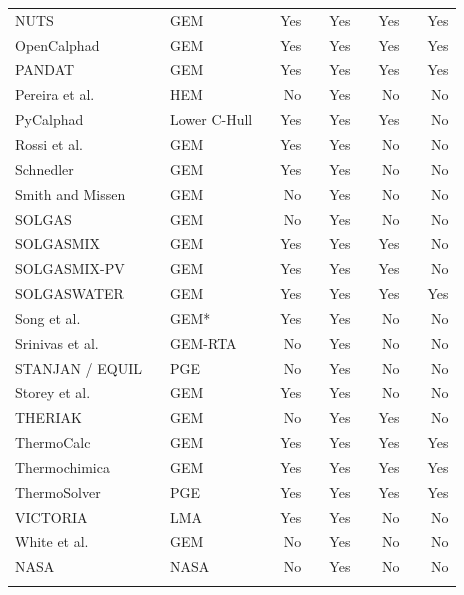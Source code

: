 {\begin{longtable}{@{}lclcrcrcrcr@{}}
		NUTS \cite{Loukusa:2014aa} && {GEM} && Yes && Yes && Yes && Yes\\
		OpenCalphad \cite{Sundman:2015aa} && {GEM} && Yes && Yes && Yes && Yes\\
		PANDAT \cite{Cao09} && {GEM} && Yes && Yes && Yes && Yes\\
		Pereira et al. \cite{PEREIRA20101} && {HEM} && No && Yes && No && No\\
		PyCalphad \cite{Otis:2017aa} && {Lower C-Hull} && Yes && Yes && Yes && No\\
		Rossi et al. \cite{ROSSI20111226} && GEM && Yes && Yes && No && No\\
		Schnedler \cite{SCHNEDLER1984265} && GEM && Yes && Yes && No && No\\
		Smith and Missen \cite{Smith:1988aa} && GEM && No && Yes && No && No\\
		SOLGAS \cite{Eriksson71} && GEM && No && Yes && No && No\\
		SOLGASMIX \cite{Eriksson:1975aa} && GEM && Yes && Yes && Yes && No\\
		SOLGASMIX-PV \cite{Besmann:1977aa} && GEM && Yes && Yes && Yes && No\\
		SOLGASWATER \cite{ERIKSSON1979375} && GEM && Yes && Yes && Yes && Yes\\
		Song et al. \cite{SONG19912513} && GEM* && Yes && Yes && No && No\\
		Srinivas et al. \cite{Srinivas06} && GEM-RTA && No && Yes && No && No\\
		STANJAN / EQUIL \cite{Reynolds86} && PGE && No && Yes && No && No\\
		Storey et al. \cite{Storey:1964aa} && GEM && Yes && Yes && No && No\\
		THERIAK \cite{DECAPITANI19872639} && GEM && No && Yes && Yes && No\\
		ThermoCalc \cite{ANDERSSON2002273} && GEM && Yes && Yes && Yes && Yes\\
		Thermochimica \cite{Piro13} && GEM && Yes && Yes && Yes && Yes\\
		ThermoSolver \cite{Piro11b} && PGE && Yes && Yes && Yes && Yes\\
		VICTORIA \cite{Heams:1992aa} && LMA && Yes && Yes && No && No\\
		White et al. \cite{White:58} && GEM && No && Yes && No && No\\
		NASA \cite{Zeleznik:1968aa} && NASA && No && Yes && No && No\\
		\bottomrule\label{tab:gemreview}
	\end{longtable}
}
	
